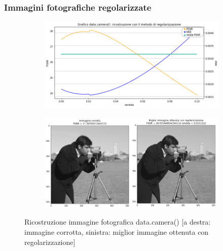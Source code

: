 \subsubsection{Immagini fotografiche regolarizzate}
\begin{figure}[H]
    \centering
    \begin{subfigure}{0.5\textwidth}
        \includegraphics[width=\textwidth]{imgRicostruzione/graficoCameraman_minimize.png}
    \end{subfigure}%
    \begin{subfigure}{0.5\textwidth}
        \centering
        \includegraphics[width=\textwidth]{imgRicostruzione/ricostruzioneCameraman_minimize.png}
    \end{subfigure}
    \caption{Ricostruzione immagine fotografica data.camera() [a destra: immagine corrotta, sinistra: miglior immagine ottenuta con regolarizzazione]}
    

\end{figure}
